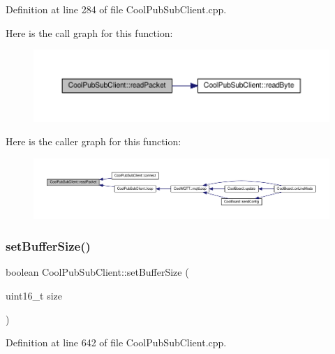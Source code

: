 Definition at line 284 of file Cool\+Pub\+Sub\+Client.\+cpp.

Here is the call graph for this function\+:\nopagebreak
\begin{figure}[H]
\begin{center}
\leavevmode
\includegraphics[width=350pt]{class_cool_pub_sub_client_a25a8779149cfa809b7c06f63568b25cf_cgraph}
\end{center}
\end{figure}
Here is the caller graph for this function\+:\nopagebreak
\begin{figure}[H]
\begin{center}
\leavevmode
\includegraphics[width=350pt]{class_cool_pub_sub_client_a25a8779149cfa809b7c06f63568b25cf_icgraph}
\end{center}
\end{figure}
\mbox{\label{class_cool_pub_sub_client_a4f83e54f1ba96e32f725d93cdec283b7}} 
\subsubsection{\texorpdfstring{set\+Buffer\+Size()}{setBufferSize()}}
{\footnotesize\ttfamily boolean Cool\+Pub\+Sub\+Client\+::set\+Buffer\+Size (\begin{DoxyParamCaption}\item[{uint16\+\_\+t}]{size }\end{DoxyParamCaption})}



Definition at line 642 of file Cool\+Pub\+Sub\+Client.\+cpp.

